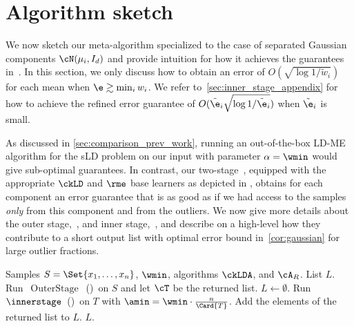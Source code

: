 \section{Algorithm sketch}
\label{sec:proof_sketch}

We now sketch our meta-algorithm specialized to the case of separated Gaussian components $\cN(\mu_i,I_d)$ and provide intuition for how it achieves the guarantees in~.
In this section, we only discuss how to obtain an error of $O(\sqrt{\log 1/\tilde{w}_i})$ for each mean when  %
\(\e \gtrsim \min_i w_i\).
We refer to~\cref{sec:inner_stage_appendix} for how to achieve the refined error guarantee of $O(\tilde{\e}_i\sqrt{\log 1/\tilde{\e}_i})$ when $\tilde{\e}_i$ is small.

As discussed in \cref{sec:comparison_prev_work}, running an out-of-the-box LD-ME algorithm for the sLD problem on our input with parameter $\alpha = \wmin$ would give sub-optimal guarantees.
In contrast, our two-stage~, equipped with the appropriate $\ckLD$ and $\rme$ base learners as depicted in , obtains for each component an error guarantee that is as good as if we had access to the samples \textit{only} from this component and from the outliers. 
We now give more details about the outer stage,~, and inner stage,~, and describe on a high-level how they contribute to a short output list with optimal error bound in~\cref{cor:gaussian} for large outlier fractions. 


\begin{algorithm}[t]
\caption{\(\operatorname{FullAlgorithm}\)}
    \label{alg:full_alg}
    \begin{algorithmic}[1]
    \Require Samples $S = \Set{x_1, \ldots, x_{n}}$, \(\wmin\), algorithms $\ckLDA$, and $\cA_{R}$.
    \Ensure List \(L\).
    \State Run~\(\operatorname{OuterStage}\)~()~on \(S\) and let \(\cT\) be the returned list.
    \State \(L \gets \emptyset\).
        \State Run~\(\innerstage\)~()~on \(T\) with \(\amin = \wmin \cdot \frac{n}{\Card{T}}\).
        \State Add the elements of the returned list to \(L\).
    \EndFor
    \State \Return \(L\).
    \end{algorithmic}
\end{algorithm}


